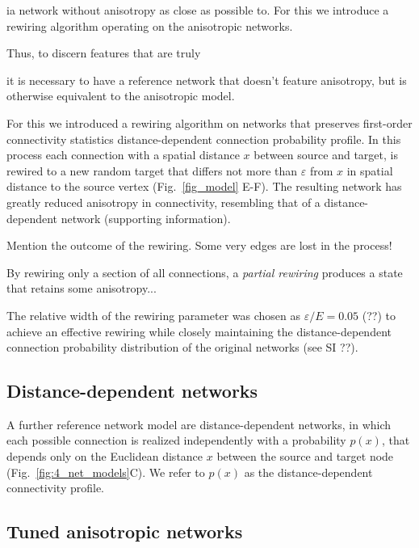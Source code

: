 ia network without anisotropy as close as possible to. For this we introduce a rewiring algorithm operating
on the anisotropic networks.

Thus, to
discern features that are truly 

it is necessary to have a reference network that doesn't
feature anisotropy, but is otherwise equivalent to the anisotropic
model.

For this we introduced a rewiring algorithm on networks that
preserves first-order connectivity statistics %
distance-dependent connection probability profile. In this process
each connection with a spatial distance $x$ between source and target,
is rewired to a new random target that differs not more than
$\varepsilon$ from $x$ in spatial distance to the source vertex
(Fig.~\ref{fig_model} E-F). The resulting network has greatly reduced
anisotropy in connectivity, resembling that of a distance-dependent
network (supporting information).

Mention the outcome of the rewiring. Some very edges are lost in the process! %

By rewiring only a section of all connections, a \textit{partial
  rewiring} produces a state that retains some anisotropy...



The relative width of the rewiring parameter was chosen as $\varepsilon / E = 0.05$ (??) to achieve an effective rewiring while closely maintaining the distance-dependent connection probability distribution of the original networks (see SI ??).





\subsection*{Distance-dependent networks}

A further reference network model are distance-dependent networks, in which each possible connection is realized independently with a probability $p(x)$, that depends only on the Euclidean distance $x$ between the source and target node (Fig.~\ref{fig:4_net_models}C). We refer to $p(x)$ as the distance-dependent connectivity profile.


\subsection*{Tuned anisotropic networks}




